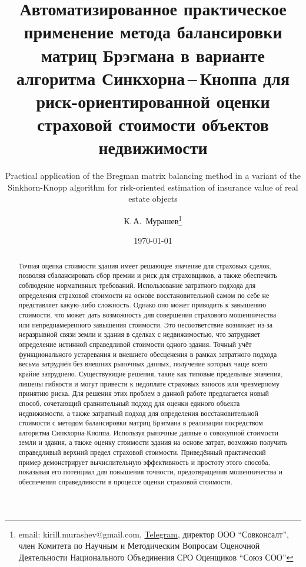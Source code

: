\documentclass[12pt]{scrartcl}
\title{Автоматизированное практическое применение метода балансировки матриц Брэгмана в варианте алгоритма Синкхорна\,--\,Кноппа для риск-ориентированной оценки страховой стоимости объектов недвижимости}
\subtitle{\foreignlanguage{english}{Practical application of the Bregman matrix balancing method in a variant of the Sinkhorn-Knopp algorithm for risk-oriented estimation of insurance value of real estate objects}}
\author{К.\,А.~Мурашев\thanks{email: kirill.murashev@gmail.com, \href{https://t.me/AIinValuation}{Telegram}, директор ООО ``Совконсалт'', член Комитета по Научным и Методическим Вопросам Оценочной Деятельности Национального Объединения СРО Оценщиков ``Союз СОО''}}
\date{\today}
\begin{document}
\maketitle

\begin{abstract}
Точная оценка стоимости здания имеет решающее значение для страховых сделок, позволяя сбалансировать сбор премии и риск для страховщиков, а также обеспечить соблюдение нормативных требований. Использование затратного подхода для определения страховой стоимости на основе восстановительной самом по себе не представляет какую-либо сложность. Однако оно может приводить к завышению стоимости, что может дать возможность для совершения страхового мошенничества или непреднамеренного завышения стоимости. Это несоответствие возникает из-за неразрывной связи земли и здания в сделках с недвижимостью, что затрудняет определение истинной справедливой стоимости одного здания. Точный учёт функционального устаревания и внешнего обесценения в рамках затратного подхода весьма затруднён без внешних рыночных данных, получение которых чаще всего крайне затруднено. Существующие решения, такие как типовые предельные значения, лишены гибкости и могут привести к недоплате страховых взносов или чрезмерному принятию риска. Для решения этих проблем в данной работе предлагается новый способ, сочетающий сравнительный подход для оценки единого объекта недвижимости, а также затратный подход для определения восстановительной стоимости с методом балансировки матриц Брэгмана в реализации посредством алгоритма Синкхорна-Кноппа. Используя рыночные данные о совокупной стоимости земли и здания, а также оценку стоимости здания на основе затрат, возможно получить справедливый верхний предел страховой стоимости. Приведённый практический пример демонстрирует вычислительную эффективность и простоту этого способа, показывая его потенциал для повышения точности, предотвращения мошенничества и обеспечения справедливости в процессе оценки страховой стоимости.



\end{abstract}
\end{document}
